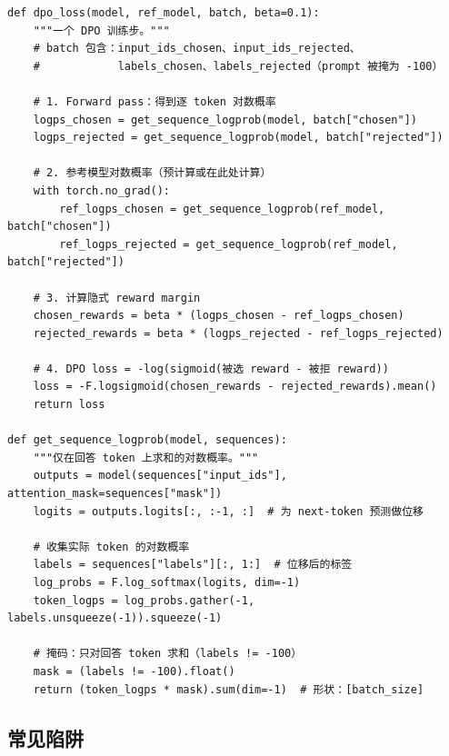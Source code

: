 \begin{examplebox}
\begin{lstlisting}[style=pythonstyle]
def dpo_loss(model, ref_model, batch, beta=0.1):
    """一个 DPO 训练步。"""
    # batch 包含：input_ids_chosen、input_ids_rejected、
    #            labels_chosen、labels_rejected（prompt 被掩为 -100）

    # 1. Forward pass：得到逐 token 对数概率
    logps_chosen = get_sequence_logprob(model, batch["chosen"])
    logps_rejected = get_sequence_logprob(model, batch["rejected"])

    # 2. 参考模型对数概率（预计算或在此处计算）
    with torch.no_grad():
        ref_logps_chosen = get_sequence_logprob(ref_model, batch["chosen"])
        ref_logps_rejected = get_sequence_logprob(ref_model, batch["rejected"])

    # 3. 计算隐式 reward margin
    chosen_rewards = beta * (logps_chosen - ref_logps_chosen)
    rejected_rewards = beta * (logps_rejected - ref_logps_rejected)

    # 4. DPO loss = -log(sigmoid(被选 reward - 被拒 reward))
    loss = -F.logsigmoid(chosen_rewards - rejected_rewards).mean()
    return loss

def get_sequence_logprob(model, sequences):
    """仅在回答 token 上求和的对数概率。"""
    outputs = model(sequences["input_ids"], attention_mask=sequences["mask"])
    logits = outputs.logits[:, :-1, :]  # 为 next-token 预测做位移

    # 收集实际 token 的对数概率
    labels = sequences["labels"][:, 1:]  # 位移后的标签
    log_probs = F.log_softmax(logits, dim=-1)
    token_logps = log_probs.gather(-1, labels.unsqueeze(-1)).squeeze(-1)

    # 掩码：只对回答 token 求和（labels != -100）
    mask = (labels != -100).float()
    return (token_logps * mask).sum(dim=-1)  # 形状：[batch_size]
\end{lstlisting}
\end{examplebox}

\subsection{常见陷阱}
\label{common-pitfalls}

